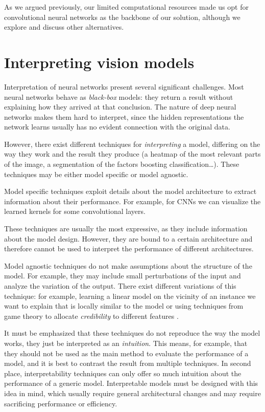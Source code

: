As we argued previously, our limited computational resources made us opt for convolutional neural networks as the backbone of our solution, although we explore and discuss other alternatives. 

\section{Interpreting vision models} \label{seq:transformer}
Interpretation of neural networks present several significant challenges. Most neural networks behave as \textit{black-box} models: they return a result without explaining how they arrived at that conclusion. The nature of deep neural networks makes them hard to interpret, since the hidden representations the network learns usually has no evident connection with the original data.

However, there exist different techniques for \textit{interpreting} a model, differing on the way they work and the result they produce (a heatmap of the most relevant parts of the image, a segmentation of the factors boosting classification…). These techniques may be either model specific or model agnostic. 

Model specific techniques exploit details about the model architecture to extract information about their performance. For example, for CNNs we can visualize the learned kernels for some convolutional layers. 

These techniques are usually the most expressive, as they include information about the model design. However, they are bound to a certain architecture and therefore cannot be used to interpret the performance of different architectures.

Model agnostic techniques do not make assumptions about the structure of the model. For example, they may include small perturbations of the input and analyze the variation of the output. There exist different variations of this technique: for example, learning a linear model on the vicinity of an instance we want to explain that is locally similar to the model \cite{lime} or using techniques from game theory to allocate \textit{credibility} to different features \cite{lundberg2017unified}.

It must be emphasized that these techniques do not reproduce the way the model works, they just be interpreted as an \textit{intuition}. This means, for example, that they should not be used as the main method to evaluate the performance of a model, and it is best to contrast the result from multiple techniques. In second place, interpretability techniques can only offer so much intuition about the performance of a generic model. Interpretable models must be designed with this idea in mind, which usually require general architectural changes and may require sacrificing performance or efficiency.